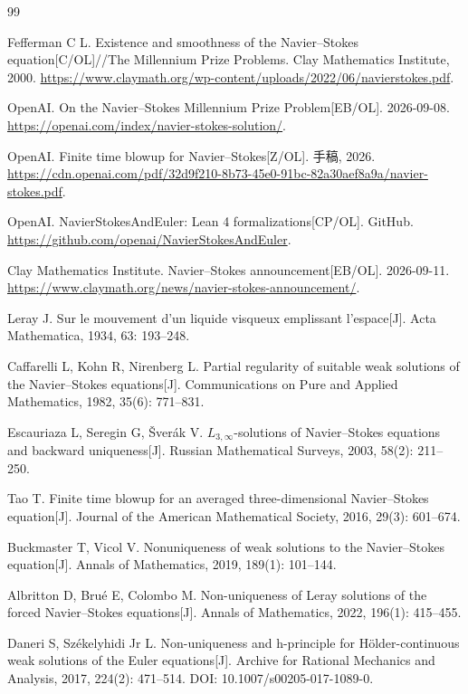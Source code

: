\begin{thebibliography}{99}
\small
\setlength{\itemsep}{2pt}

 Fefferman C L. Existence and smoothness of the Navier--Stokes equation[C/OL]//The Millennium Prize Problems. Clay Mathematics Institute, 2000. \url{https://www.claymath.org/wp-content/uploads/2022/06/navierstokes.pdf}.

 OpenAI. On the Navier--Stokes Millennium Prize Problem[EB/OL]. 2026-09-08. \url{https://openai.com/index/navier-stokes-solution/}.

 OpenAI. Finite time blowup for Navier--Stokes[Z/OL]. 手稿, 2026. \url{https://cdn.openai.com/pdf/32d9f210-8b73-45e0-91bc-82a30aef8a9a/navier-stokes.pdf}.

 OpenAI. NavierStokesAndEuler: Lean 4 formalizations[CP/OL]. GitHub. \url{https://github.com/openai/NavierStokesAndEuler}.

 Clay Mathematics Institute. Navier--Stokes announcement[EB/OL]. 2026-09-11. \url{https://www.claymath.org/news/navier-stokes-announcement/}.

 Leray J. Sur le mouvement d'un liquide visqueux emplissant l'espace[J]. Acta Mathematica, 1934, 63: 193--248.

 Caffarelli L, Kohn R, Nirenberg L. Partial regularity of suitable weak solutions of the Navier--Stokes equations[J]. Communications on Pure and Applied Mathematics, 1982, 35(6): 771--831.

 Escauriaza L, Seregin G, \v{S}ver\'ak V. $L_{3,\infty}$-solutions of Navier--Stokes equations and backward uniqueness[J]. Russian Mathematical Surveys, 2003, 58(2): 211--250.

 Tao T. Finite time blowup for an averaged three-dimensional Navier--Stokes equation[J]. Journal of the American Mathematical Society, 2016, 29(3): 601--674.

 Buckmaster T, Vicol V. Nonuniqueness of weak solutions to the Navier--Stokes equation[J]. Annals of Mathematics, 2019, 189(1): 101--144.

 Albritton D, Bru\'e E, Colombo M. Non-uniqueness of Leray solutions of the forced Navier--Stokes equations[J]. Annals of Mathematics, 2022, 196(1): 415--455.

 Daneri S, Sz\'ekelyhidi Jr L. Non-uniqueness and h-principle for H\"older-continuous weak solutions of the Euler equations[J]. Archive for Rational Mechanics and Analysis, 2017, 224(2): 471--514. DOI: 10.1007/s00205-017-1089-0.


\end{thebibliography}
